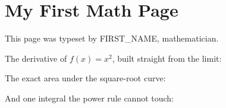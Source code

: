 
\section{My First Math Page}

This page was typeset by {{FIRST_NAME}}, mathematician.

The derivative of $f(x) = x^2$, built straight from the limit:



The exact area under the square-root curve:



And one integral the power rule cannot touch:


